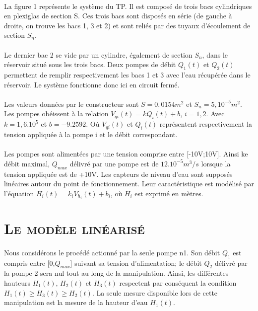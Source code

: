  \paragraph{} La figure 1 représente le système du TP. Il est composé de trois bacs cylindriques en plexiglas de section S. Ces trois bacs sont disposés en série (de gauche à droite, on trouve les bacs 1, 3 et 2) et sont reliés par des tuyaux d'écoulement de section $S_n$.
\paragraph{} Le dernier bac 2 se vide par un cylindre, également de section $S_n$, dans le réservoir situé sous les trois bacs. Deux pompes de débit $Q_1(t)$ et $Q_2(t)$ permettent de remplir respectivement les bacs 1 et 3 avec l'eau récupérée dans le réservoir. Le système fonctionne donc ici en circuit fermé. 
\paragraph{} Les valeurs données par le constructeur sont $S=0,0154m^2$ et $S_n=5,10^{-5}m^2$. Les pompes obéissent à la relation $V_{qi}(t)=kQ_i(t)+b$, $i=1,2$. Avec $k=1,6.10^5$ et $b=-9.2592$. Où $V_{qi}(t)$ et $Q_i(t)$ représentent respectivement la tension appliquée à la pompe i et le débit correspondant.
\paragraph{} Les pompes sont alimentées par une tension comprise entre [-10V;10V]. Ainsi ke débit maximal, $Q_{max}$ délivré par une pompe est de $12.10^{-5}m^3/s$ lorsque la tension appliquée est de +10V. Les capteurs de niveau d'eau sont supposés linéaires autour du point de fonctionnement. Leur caractéristique est modélisé par l'équation $H_i(t)=k_iV_{h_i}(t)+b_i$, où $H_i$ est exprimé en mètres.

\section{\textsc{Le modèle linéarisé}}

\paragraph{} Nous considérons le procédé actionné par la seule pompe n1. Son débit $Q_1$ est compris entre [0,$Q_{max}$] suivant sa tension d'alimentation; le débit $Q_2$ délivré par la pompe 2 sera nul tout au long de la manipulation. Ainsi, les différentes hauteurs $H_1(t)$, $H_2(t)$ et $H_3(t)$ respectent par conséquent la condition $H_1(t)\ge H_3(t)\ge H_2(t)$. La seule mesure disponible lors de cette manipulation est la mesure de la hauteur d'eau $H_1(t)$.
